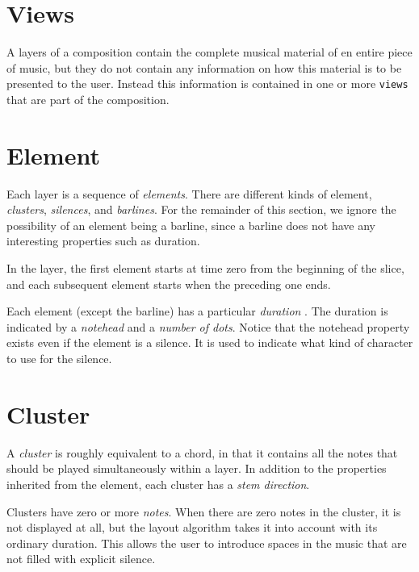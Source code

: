 \section{Views}

A layers of a composition contain the complete musical material of en
entire piece of music, but they do not contain any information on how
this material is to be presented to the user.  Instead this
information is contained in one or more \texttt{views} that are part
of the composition.

\section{Element}

Each layer is a sequence of \emph{elements}.  There are
different kinds of element, \emph{clusters},
\emph{silences}, and \emph{barlines}.
For the remainder of this section, we ignore the possibility of
an element being a barline, since a barline does not have any
interesting properties such as duration.

In the layer, the first element starts at time zero from the
beginning of the slice, and each subsequent element starts when the
preceding one ends. 

Each element (except the barline) has a particular \emph{duration}
.  The duration is indicated by a \emph{notehead}
 and a \emph{number of dots}. 
 Notice that the notehead property exists even
if the element is a silence.  It is used to indicate what kind of
character to use for the silence.

\section{Cluster}

A \emph{cluster} is roughly equivalent to a chord, in
that it contains all the notes that should be played simultaneously
within a layer.  In addition to the properties inherited from the
element, each cluster has a \emph{stem direction}.  

Clusters have zero or more \emph{notes}.  When there are zero notes in
the cluster, it is not displayed at all, but the layout algorithm
takes it into account with its ordinary duration.  This allows the
user to introduce spaces in the music that are not filled with
explicit silence. 

